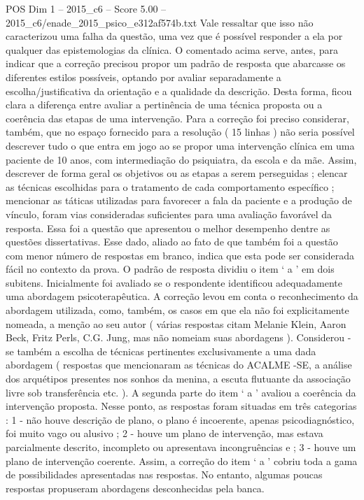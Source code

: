 \begin{textsample}{POS Dim 1 – 2015\_c6 – Score 5.00 – 2015\_c6/enade\_2015\_psico\_e312af574b.txt}
Vale ressaltar que isso não caracterizou uma falha da questão, uma vez que é possível responder a ela por qualquer das epistemologias da clínica.
O comentado acima serve, antes, para indicar que a correção precisou propor um padrão de resposta que abarcasse os diferentes estilos possíveis, optando por avaliar separadamente a escolha/justificativa da orientação e a qualidade da descrição.
Desta forma, ficou clara a diferença entre avaliar a pertinência de uma técnica proposta ou a coerência das etapas de uma intervenção.
Para a correção foi preciso considerar, também, que no espaço fornecido para a resolução ( 15 linhas ) não seria possível descrever tudo o que entra em jogo ao se propor uma intervenção clínica em uma paciente de 10 anos, com intermediação do psiquiatra, da escola e da mãe.
Assim, descrever de forma geral os objetivos ou as etapas a serem perseguidas ; elencar as técnicas escolhidas para o tratamento de cada comportamento específico ; mencionar as táticas utilizadas para favorecer a fala da paciente e a produção de vínculo, foram vias consideradas suficientes para uma avaliação favorável da resposta.
Essa foi a questão que apresentou o melhor desempenho dentre as questões dissertativas.
Esse dado, aliado ao fato de que também foi a questão com menor número de respostas em branco, indica que esta pode ser considerada fácil no contexto da prova.
O padrão de resposta dividiu o item ‘ a ’ em dois subitens.
Inicialmente foi avaliado se o respondente identificou adequadamente uma abordagem psicoterapêutica.
A correção levou em conta o reconhecimento da abordagem utilizada, como, também, os casos em que ela não foi explicitamente nomeada, a menção ao seu autor ( várias respostas citam Melanie Klein, Aaron Beck, Fritz Perls, C.G.
Jung, mas não nomeiam suas abordagens ).
Considerou -se também a escolha de técnicas pertinentes exclusivamente a uma dada abordagem ( respostas que mencionaram as técnicas do ACALME -SE, a análise dos arquétipos presentes nos sonhos da menina, a escuta flutuante da associação livre sob transferência etc. ).
A segunda parte do item ‘ a ’ avaliou a coerência da intervenção proposta.
Nesse ponto, as respostas foram situadas em três categorias : 1 - não houve descrição de plano, o plano é incoerente, apenas psicodiagnóstico, foi muito vago ou alusivo ; 2 - houve um plano de intervenção, mas estava parcialmente descrito, incompleto ou apresentava incongruências e ; 3 - houve um plano de intervenção coerente.
Assim, a correção do item ‘ a ’ cobriu toda a gama de possibilidades apresentadas nas respostas.
No entanto, algumas poucas respostas propuseram abordagens desconhecidas pela banca.

\end{textsample}
